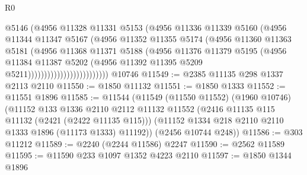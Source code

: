 \begin{lexlean}{R0}
\begin{coremodule}
                                    @5146
                                    (@4956
                                      @11328
                                      @11331
                                      @5153
                                      (@4956
                                        @11336
                                        @11339
                                        @5160
                                        (@4956
                                          @11344
                                          @11347
                                          @5167
                                          (@4956
                                            @11352
                                            @11355
                                            @5174
                                            (@4956
                                              @11360
                                              @11363
                                              @5181
                                              (@4956
                                                @11368
                                                @11371
                                                @5188
                                                (@4956
                                                  @11376
                                                  @11379
                                                  @5195
                                                  (@4956
                                                    @11384
                                                    @11387
                                                    @5202
                                                    (@4956
                                                      @11392
                                                      @11395
                                                      @5209
                                                      @5211)))))))))))))))))))))))))
    @10746
@11549 := @2385 @11135 @298 @1337 @2113 @2110
@11550 := @1850 @11132
@11551 := @1850 @1333
@11552 := @11551 @1896
@11585 := @11544
    (@11549
      (@11550 @11552)
      (@1960 @10746)
      (@11152
        @133
        @1336
        @2110
        @2112
        @11132
        @11552
        (@2416 @11135 @115 @11132 (@2421 (@2422 @11135 @115)))
        (@11152 @1334 @218 @2110 @2110 @1333 @1896 (@11173 @1333) @11192))
      (@2456 @10744 @248))
@11586 := @303 @11212
@11589 := @2240 (@2244 @11586) @2247
@11590 := @2562 @11589
@11595 := @11590 @233 @1097 @1352 @4223 @2110
@11597 := @1850 @1344 @1896

\end{coremodule}
\end{lexlean}
